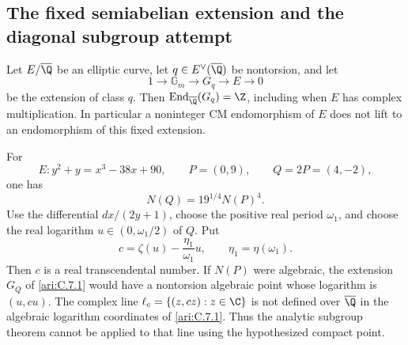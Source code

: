 \subsection{The fixed semiabelian extension and the diagonal subgroup attempt}

\begin{proposition}\label{ari:C.7.9}
Let $E/\overline\Q$ be an elliptic curve, let
$q\in E^\vee(\overline\Q)$ be nontorsion, and let
\[
 1\longrightarrow\mathbb G_m\longrightarrow G_q
       \longrightarrow E\longrightarrow0
\]
be the extension of class $q$. Then
$\operatorname{End}_{\overline\Q}(G_q)=\Z$, including when
$E$ has complex multiplication. In particular a noninteger
CM endomorphism of $E$ does not lift to an endomorphism of this
fixed extension.

For
\[
 E:y^2+y=x^3-38x+90,\qquad P=(0,9),\qquad Q=2P=(4,-2),
\]
one has
\[
 N(Q)=19^{1/4}N(P)^4.
\]
Use the differential $dx/(2y+1)$, choose the positive real
period $\omega_1$, and choose the real logarithm
$u\in(0,\omega_1/2)$ of $Q$. Put
\begin{equation}\label{ari:eq:cd-slope}
 c=\zeta(u)-\frac{\eta_1}{\omega_1}u,
 \qquad \eta_1=\eta(\omega_1).
\end{equation}
Then $c$ is a real transcendental number. If $N(P)$ were
algebraic, the extension $G_Q$ of \ref{ari:C.7.1} would have a
nontorsion algebraic point whose logarithm is $(u,cu)$.
The complex line
$\ell_c=\{(z,cz):z\in\C\}$ is not defined over
$\overline\Q$ in the algebraic logarithm coordinates of
\ref{ari:C.7.1}. Thus the analytic subgroup theorem cannot be applied
to that line using the hypothesized compact point.
\end{proposition}

